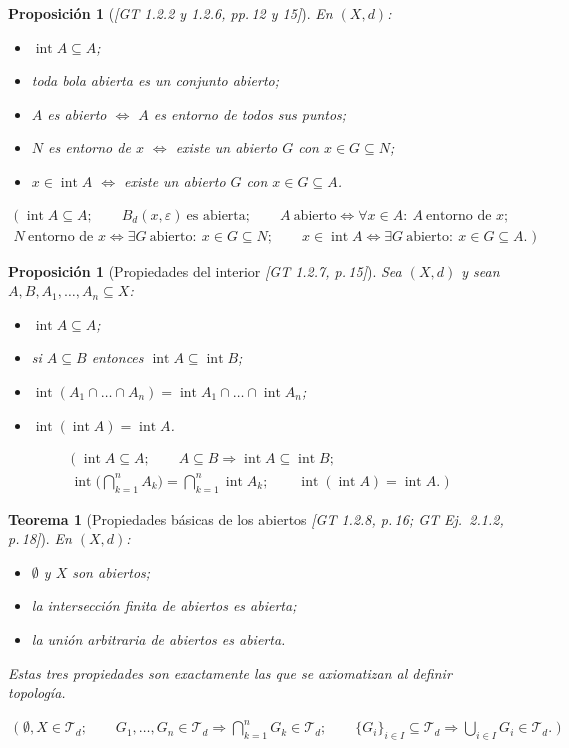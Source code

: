 \documentclass[11pt,a4paper]{article}
\newenvironment{lista}{\leavevmode\begin{itemize}[leftmargin=1.5em,itemsep=1pt,topsep=2pt,parsep=0pt]}{\end{itemize}}
\newcommand{\lgc}[1]{\par\vspace{-3pt}\begin{gather*}\big(\;#1\;\big)\end{gather*}\vspace{-6pt}}
\theoremstyle{definition}
\theoremstyle{plain}
\newtheorem{teorema}[definicion]{Teorema}
\newtheorem{proposicion}[definicion]{Proposición}
\newcommand{\fnt}[1]{{\normalfont\small\itshape\color{gray!150!black}[#1]}}
\newcommand{\intr}{\operatorname{int}}
\newcommand{\Bola}[2]{B_d(#1,#2)}
\newcommand{\tp}{\mathcal{T}}
\begin{document}
\begin{proposicion}[\fnt{GT 1.2.2 y 1.2.6, pp.\,12 y 15}]
En $(X,d)$:
\begin{lista}
\item $\intr A\subseteq A$;
\item toda bola abierta es un conjunto abierto;
\item $A$ es abierto $\iff$ $A$ es entorno de todos sus puntos;
\item $N$ es entorno de $x$ $\iff$ existe un abierto $G$ con $x\in G\subseteq N$;
\item $x\in\intr A$ $\iff$ existe un abierto $G$ con $x\in G\subseteq A$.
\end{lista}
\lgc{\intr A\subseteq A;\qquad \Bola{x}{\varepsilon}\ \text{es abierta};\qquad
A\ \text{abierto}\iff \forall x\in A:\ A\ \text{entorno de } x;\\
N\ \text{entorno de } x\iff \exists G\ \text{abierto}:\ x\in G\subseteq N;\qquad
x\in\intr A\iff \exists G\ \text{abierto}:\ x\in G\subseteq A.}
\end{proposicion}

\begin{proposicion}[Propiedades del interior \fnt{GT 1.2.7, p.\,15}]
Sea $(X,d)$ y sean $A,B,A_1,\dots,A_n\subseteq X$:
\begin{lista}
\item $\intr A\subseteq A$;
\item si $A\subseteq B$ entonces $\intr A\subseteq\intr B$;
\item $\intr(A_1\cap\dots\cap A_n)=\intr A_1\cap\dots\cap\intr A_n$;
\item $\intr(\intr A)=\intr A$.
\end{lista}
\lgc{\intr A\subseteq A;\qquad A\subseteq B\Rightarrow\intr A\subseteq\intr B;\\
\intr\Big(\bigcap_{k=1}^{n}A_k\Big)=\bigcap_{k=1}^{n}\intr A_k;\qquad \intr(\intr A)=\intr A.}
\end{proposicion}

\begin{teorema}[Propiedades básicas de los abiertos \fnt{GT 1.2.8, p.\,16; GT Ej.\ 2.1.2, p.\,18}]
En $(X,d)$:
\begin{lista}
\item $\emptyset$ y $X$ son abiertos;
\item la intersección \emph{finita} de abiertos es abierta;
\item la unión \emph{arbitraria} de abiertos es abierta.
\end{lista}
Estas tres propiedades son exactamente las que se axiomatizan al definir topología.
\lgc{\emptyset,X\in\tp_d;\qquad G_1,\dots,G_n\in\tp_d\Rightarrow\bigcap_{k=1}^{n}G_k\in\tp_d;\qquad
\{G_i\}_{i\in I}\subseteq\tp_d\Rightarrow\bigcup_{i\in I}G_i\in\tp_d.}
\end{teorema}
\end{document}
